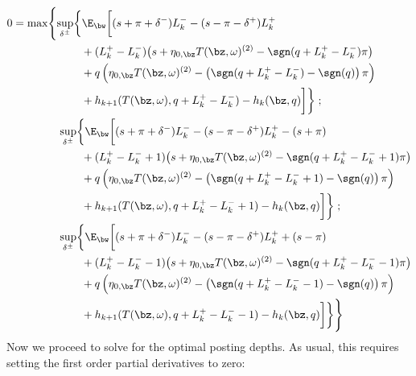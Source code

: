 \documentclass[12pt]{article}
\begin{document}
\begin{align}
\begin{split}
0 & = \max \Biggl\lbrace 
\sup_{\delta^\pm} \biggl\lbrace \E_{\bw} \biggl[
(s + \pi + \delta^-)L_k^- - (s - \pi - \delta^+)L_k^+ \\
& \hphantom{\sup_{\bu} \biggl\lbrace \E_{\bw} \biggl[ {}+{}} + (L_k^+ - L_k^-) \bigl( s + \eta_{0,\bz} T(\bz, \omega)^{(2)}  -\sgn( q + L_k^+ - L_k^-)\pi   \bigr) \\
& \hphantom{\sup_{\bu} \biggl\lbrace \E_{\bw} \biggl[ {}+{}} + q\left( \eta_{0,\bz} T(\bz, \omega)^{(2)}  -\left( \sgn( q + L_k^+ - L_k^-) - \sgn(q) \right) \pi \right) \\
& \hphantom{\sup_{\bu} \biggl\lbrace \E_{\bw} \biggl[ {}+{}} + h_{k+1}(T(\bz,\omega), q + L_k^+ - L_k^- ) -  h_k(\bz,q) \biggr] \biggr\rbrace \; ;\\
& \hphantom{{}={} \max \biggl\lbrace } \sup_{\delta^\pm} \biggl\lbrace \E_{\bw} \biggl[
(s + \pi + \delta^-)L_k^- - (s - \pi - \delta^+)L_k^+ - (s + \pi)\\
& \hphantom{\sup_{\bu} \biggl\lbrace \E_{\bw} \biggl[ {}+{}} + (L_k^+ - L_k^- +1) \bigl( s + \eta_{0,\bz} T(\bz, \omega)^{(2)}  -\sgn( q + L_k^+ - L_k^- +1)\pi   \bigr) \\
& \hphantom{\sup_{\bu} \biggl\lbrace \E_{\bw} \biggl[ {}+{}} + q\left( \eta_{0,\bz} T(\bz, \omega)^{(2)}  -\left( \sgn( q + L_k^+ - L_k^- +1) - \sgn(q) \right) \pi \right) \\
& \hphantom{\sup_{\bu} \biggl\lbrace \E_{\bw} \biggl[ {}+{}} + h_{k+1}(T(\bz,\omega), q + L_k^+ - L_k^- + 1) -  h_k(\bz,q) \biggr] \biggr\rbrace \; ; \\
& \hphantom{{}={} \max \biggl\lbrace } \sup_{\delta^\pm} \biggl\lbrace \E_{\bw} \biggl[
(s + \pi + \delta^-)L_k^- - (s - \pi - \delta^+)L_k^+ + (s - \pi) \\
& \hphantom{\sup_{\bu} \biggl\lbrace \E_{\bw} \biggl[ {}+{}} + (L_k^+ - L_k^- -1) \bigl( s + \eta_{0,\bz} T(\bz, \omega)^{(2)}  -\sgn( q + L_k^+ - L_k^- -1)\pi   \bigr) \\
& \hphantom{\sup_{\bu} \biggl\lbrace \E_{\bw} \biggl[ {}+{}} + q\left( \eta_{0,\bz} T(\bz, \omega)^{(2)}  -\left( \sgn( q + L_k^+ - L_k^- -1) - \sgn(q) \right) \pi \right) \\
& \hphantom{\sup_{\bu} \biggl\lbrace \E_{\bw} \biggl[ {}+{}} + h_{k+1}(T(\bz,\omega), q + L_k^+ - L_k^- -1) -  h_k(\bz,q) \biggr] \biggr\rbrace  \Biggr\rbrace
\end{split}
\end{align}
Now we proceed to solve for the optimal posting depths. As usual, this requires setting the first order partial derivatives to zero:
\end{document}
